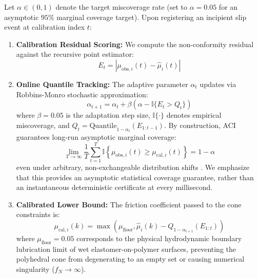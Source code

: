 Let $\alpha \in (0, 1)$ denote the target miscoverage rate (set to $\alpha = 0.05$ for an asymptotic $95\%$ marginal coverage target). Upon registering an incipient slip event at calibration index $t$:
\begin{enumerate}
    \item \textbf{Calibration Residual Scoring:} We compute the non-conformity residual against the recursive point estimator:
    \begin{equation}
        E_t = |\mu_{\text{obs}, i}(t) - \hat{\mu}_i(t)|
    \end{equation}
    \item \textbf{Online Quantile Tracking:} The adaptive parameter $\alpha_t$ updates via Robbins-Monro stochastic approximation:
    \begin{equation}
        \alpha_{t+1} = \alpha_t + \beta \left( \alpha - \mathbb{I}\{E_t > Q_t\} \right)
        \label{eq:aci_update_rule}
    \end{equation}
    where $\beta = 0.05$ is the adaptation step size, $\mathbb{I}\{\cdot\}$ denotes empirical miscoverage, and $Q_t = \text{Quantile}_{1 - \alpha_t}(E_{1:t-1})$. By construction, ACI guarantees long-run asymptotic marginal coverage:
    \begin{equation}
        \lim_{T \to \infty} \frac{1}{T} \sum_{t=1}^T \mathbb{I}\left\{\mu_{\text{obs}, i}(t) \ge \mu_{\text{cal}, i}(t)\right\} = 1 - \alpha
    \end{equation}
    even under arbitrary, non-exchangeable distribution shifts \cite{gibbs2021adaptive}. We emphasize that this provides an asymptotic statistical coverage guarantee, rather than an instantaneous deterministic certificate at every millisecond.
    \item \textbf{Calibrated Lower Bound:} The friction coefficient passed to the cone constraints is:
    \begin{equation}
        \mu_{\text{cal}, i}(k) = \max\left( \mu_{\text{floor}}, \hat{\mu}_i(k) - Q_{1 - \alpha_{t+1}}(E_{1:t}) \right)
        \label{eq:mu_cal_bound}
    \end{equation}
    where $\mu_{\text{floor}} = 0.05$ corresponds to the physical hydrodynamic boundary lubrication limit of wet elastomer-on-polymer surfaces, preventing the polyhedral cone from degenerating to an empty set or causing numerical singularity ($f_N \to \infty$).
\end{enumerate}

